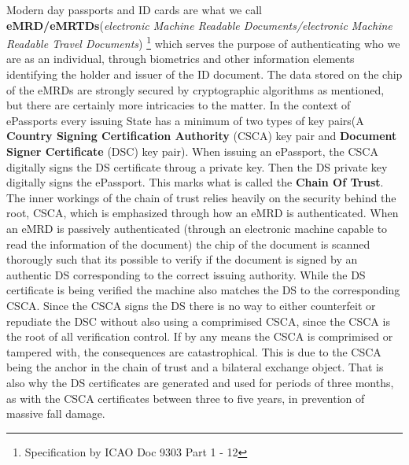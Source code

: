 \documentclass[12pt,
               a4paper,
               article,
               oneside,
               oldfontcommands,
               english]{memoir}
\begin{document}
Modern day passports and ID cards are what we call \textbf{eMRD/eMRTDs}(\emph{electronic Machine Readable Documents/electronic Machine Readable Travel Documents})\cite{ICAO} \footnote{Specification by ICAO Doc 9303 Part 1 - 12} which serves the purpose of authenticating who we are as an individual, through biometrics and other information elements identifying the holder and issuer of the ID document. The data stored on the chip of the eMRDs are strongly secured by cryptographic algorithms as mentioned, but there are certainly more intricacies to the matter. In the context of ePassports every issuing State has a minimum of two types of key pairs(A \textbf{Country Signing Certification Authority} (CSCA) key pair and \textbf{Document Signer Certificate} (DSC) key pair). When issuing an ePassport, the CSCA digitally signs the DS certificate throug a private key. Then the DS private key digitally signs the ePassport. This marks what is called the \textbf{Chain Of Trust}\cite{ICAO_2}. The inner workings of the chain of trust relies heavily on the security behind the root, CSCA, which is emphasized through how an eMRD is authenticated. When an eMRD is passively authenticated (through an electronic machine capable to read the information of the document) the chip of the document is scanned thorougly such that its possible to verify if the document is signed by an authentic DS corresponding to the correct issuing authority. While the DS certificate is being verified the machine also matches the DS to the corresponding CSCA. Since the CSCA signs the DS there is no way to either counterfeit or repudiate the DSC without also using a comprimised CSCA, since the CSCA is the root of all verification control. If by any means the CSCA is comprimised or tampered with, the consequences are catastrophical. This is due to the CSCA being the anchor in the chain of trust and a bilateral exchange object. That is also why the DS certificates are generated and used for periods of three months, as with the CSCA certificates between three to five years, in prevention of massive fall damage. \vspace{4mm}\\
\end{document}
